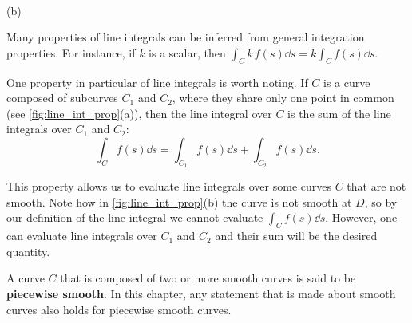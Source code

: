 {
\\(b)}

Many properties of line integrals can be inferred from general integration properties. For instance, if $k$ is a scalar, then $\int_C k\,f(s)\dd s = k\int_Cf(s)\dd s$.

One property in particular of line integrals is worth noting. If $C$ is a curve composed of subcurves $C_1$ and $C_2$, where they share only one point in common (see \autoref{fig:line_int_prop}(a)), then the line integral over $C$ is the sum of the line integrals over $C_1$ and $C_2$: 
\[\int_Cf(s)\dd s = \int_{C_1}f(s)\dd s+\int_{C_2}f(s)\dd s.\]

This property allows us to evaluate line integrals over some curves $C$ that are not smooth. Note how in \autoref{fig:line_int_prop}(b) the curve is not smooth at $D$, so by our definition of the line integral we cannot evaluate $\int_C f(s)\dd s$. However, one can evaluate line integrals over $C_1$ and $C_2$ and their sum will be the desired quantity.

A curve $C$ that is composed of two or more smooth curves is said to be \textbf{piecewise smooth}. In this chapter, any statement that is made about smooth curves also holds for piecewise smooth curves.


